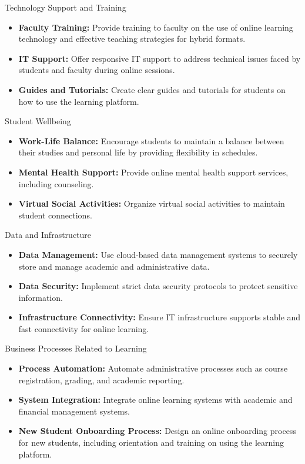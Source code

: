 \documentclass[aspectratio=169, table]{beamer}
\begin{document}
\begin{frame}{Technology Support and Training}
	\begin{itemize}
		\item \textbf{Faculty Training:} Provide training to faculty on the use of online learning technology and effective teaching strategies for hybrid formats.
		\item \textbf{IT Support:} Offer responsive IT support to address technical issues faced by students and faculty during online sessions.
		\item \textbf{Guides and Tutorials:} Create clear guides and tutorials for students on how to use the learning platform.
	\end{itemize}
\end{frame}

\begin{frame}{Student Wellbeing}
	\begin{itemize}
		\item \textbf{Work-Life Balance:} Encourage students to maintain a balance between their studies and personal life by providing flexibility in schedules.
		\item \textbf{Mental Health Support:} Provide online mental health support services, including counseling.
		\item \textbf{Virtual Social Activities:} Organize virtual social activities to maintain student connections.
	\end{itemize}
\end{frame}

\begin{frame}{Data and Infrastructure}
	\begin{itemize}
		\item \textbf{Data Management:} Use cloud-based data management systems to securely store and manage academic and administrative data.
		\item \textbf{Data Security:} Implement strict data security protocols to protect sensitive information.
		\item \textbf{Infrastructure Connectivity:} Ensure IT infrastructure supports stable and fast connectivity for online learning.
	\end{itemize}
\end{frame}

\begin{frame}{Business Processes Related to Learning}
	\begin{itemize}
		\item \textbf{Process Automation:} Automate administrative processes such as course registration, grading, and academic reporting.
		\item \textbf{System Integration:} Integrate online learning systems with academic and financial management systems.
		\item \textbf{New Student Onboarding Process:} Design an online onboarding process for new students, including orientation and training on using the learning platform.
	\end{itemize}
\end{frame}
\end{document}

